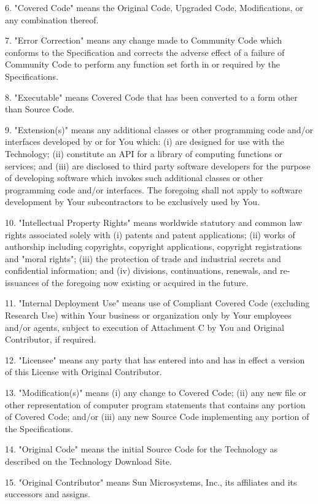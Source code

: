 {6.  "Covered Code" means the Original Code, Upgraded Code,
Modifications, or any combination thereof.

7.  "Error Correction" means any change made to Community Code which
conforms to the Specification and corrects the adverse effect of a
failure of Community Code to perform any function set forth in or
required by the Specifications.

8.  "Executable" means Covered Code that has been converted to a form
other than Source Code.

9.  "Extension(s)" means any additional classes or other programming
code and/or interfaces developed by or for You which: (i) are designed
for use with the Technology; (ii) constitute an API for a library of
computing functions or services; and (iii) are disclosed to third
party software developers for the purpose of developing software which
invokes such additional classes or other programming code and/or
interfaces.  The foregoing shall not apply to software development by
Your subcontractors to be exclusively used by You.

10.  "Intellectual Property Rights" means worldwide statutory and
common law rights associated solely with (i) patents and patent
applications; (ii) works of authorship including copyrights, copyright
applications, copyright registrations and "moral rights"; (iii) the
protection of trade and industrial secrets and confidential
information; and (iv) divisions, continuations, renewals, and
re-issuances of the foregoing now existing or acquired in the future.

11.  "Internal Deployment Use" means use of Compliant Covered Code
(excluding Research Use) within Your business or organization only by
Your employees and/or agents, subject to execution of Attachment C by
You and Original Contributor, if required.

12.  "Licensee" means any party that has entered into and has in
effect a version of this License with Original Contributor.

13.  "Modification(s)" means (i) any change to Covered Code; (ii) any
new file or other representation of computer program statements that
contains any portion of Covered Code; and/or (iii) any new Source Code
implementing any portion of the Specifications.

14.  "Original Code" means the initial Source Code for the Technology
as described on the Technology Download Site.

15.  "Original Contributor" means Sun Microsystems, Inc., its
affiliates and its successors and assigns.

}
